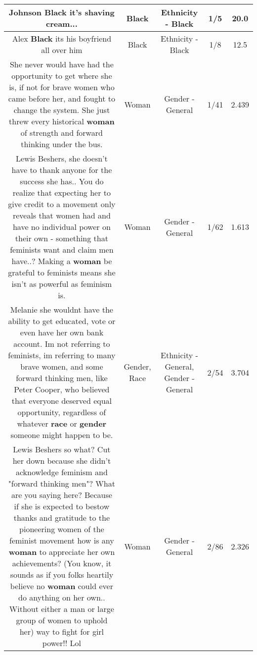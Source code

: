 \documentclass[11pt]{article}
\newlength\mylength
\begin{document}
\begin{center}
\begin{longtable}{|C{.65\mylength}|C{.30\mylength}|C{.12\mylength}|C{.12\mylength}|C{.12\mylength}|}
  \small Johnson \textbf{Black} it's shaving cream...\normalsize   & Black & Ethnicity - Black & 1/5 & 20.0 \\  \hline
  \small Alex \textbf{Black} its his boyfriend all over him\normalsize   & Black & Ethnicity - Black & 1/8 & 12.5 \\  \hline
  \small She never would have had the opportunity to get where she is, if not for brave women who came before her, and fought to change the system. She just threw every historical \textbf{woman} of strength and forward thinking under the bus.\normalsize   & Woman & Gender - General & 1/41 & 2.439 \\  \hline
  \small Lewis Beshers, she doesn't have to thank anyone for the success she has.. You do realize that expecting her to give credit to a movement only reveals that women had and have no individual power on their own - something that feminists want and claim men have..? Making a \textbf{woman} be grateful to feminists means she isn't as powerful as feminism is.\normalsize   & Woman & Gender - General & 1/62 & 1.613 \\  \hline
  \small Melanie she wouldnt have the ability to get educated, vote or even have her own bank account. Im not referring to feminists, im referring to many brave women, and some forward thinking men, like Peter Cooper, who believed that everyone deserved equal opportunity, regardless of whatever \textbf{race} or \textbf{gender} someone might happen to be.\normalsize   & Gender, Race & Ethnicity - General, Gender - General & 2/54 & 3.704 \\  \hline
  \small Lewis Beshers so what? Cut her down because she didn't acknowledge feminism and "forward thinking men"? What are you saying here? Because if she is expected to bestow thanks and gratitude to the pioneering women of the feminist movement how is any \textbf{woman} to appreciate her own achievements? (You know, it sounds as if you folks heartily believe no \textbf{woman} could ever do anything on her own.. Without either a man or large group of women to uphold her) way to fight for girl power!! Lol\normalsize   & Woman & Gender - General & 2/86 & 2.326 \\  \hline

\end{longtable}
\end{center}
\end{document}

